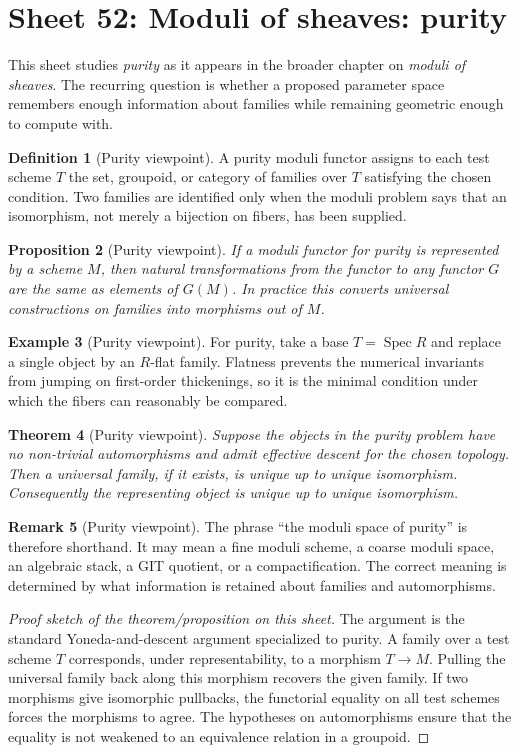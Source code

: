 \documentclass[11pt]{amsart}
\newtheorem{theorem}{Theorem}[section]
\newtheorem{proposition}[theorem]{Proposition}
\theoremstyle{definition}
\newtheorem{definition}[theorem]{Definition}
\newtheorem{example}[theorem]{Example}
\newtheorem{remark}[theorem]{Remark}
\newcommand{\Spec}{\operatorname{Spec}}
\begin{document}
\section{Sheet 52: Moduli of sheaves: purity}
This sheet studies \emph{purity} as it appears in the broader chapter on \emph{moduli of sheaves}.  The recurring question is whether a proposed parameter space remembers enough information about families while remaining geometric enough to compute with.
\begin{definition}[Purity viewpoint]
A purity moduli functor assigns to each test scheme $T$ the set, groupoid, or category of families over $T$ satisfying the chosen condition.  Two families are identified only when the moduli problem says that an isomorphism, not merely a bijection on fibers, has been supplied.
\end{definition}
\begin{proposition}[Purity viewpoint]
If a moduli functor for purity is represented by a scheme $M$, then natural transformations from the functor to any functor $G$ are the same as elements of $G(M)$.  In practice this converts universal constructions on families into morphisms out of $M$.
\end{proposition}
\begin{example}[Purity viewpoint]
For purity, take a base $T=\Spec R$ and replace a single object by an $R$-flat family.  Flatness prevents the numerical invariants from jumping on first-order thickenings, so it is the minimal condition under which the fibers can reasonably be compared.
\end{example}
\begin{theorem}[Purity viewpoint]
Suppose the objects in the purity problem have no non-trivial automorphisms and admit effective descent for the chosen topology.  Then a universal family, if it exists, is unique up to unique isomorphism.  Consequently the representing object is unique up to unique isomorphism.
\end{theorem}
\begin{remark}[Purity viewpoint]
The phrase ``the moduli space of purity'' is therefore shorthand.  It may mean a fine moduli scheme, a coarse moduli space, an algebraic stack, a GIT quotient, or a compactification.  The correct meaning is determined by what information is retained about families and automorphisms.
\end{remark}
\begin{proof}[Proof sketch of the theorem/proposition on this sheet]
The argument is the standard Yoneda-and-descent argument specialized to purity.  A family over a test scheme $T$ corresponds, under representability, to a morphism $T\to M$.  Pulling the universal family back along this morphism recovers the given family.  If two morphisms give isomorphic pullbacks, the functorial equality on all test schemes forces the morphisms to agree.  The hypotheses on automorphisms ensure that the equality is not weakened to an equivalence relation in a groupoid.
\end{proof}
\end{document}
